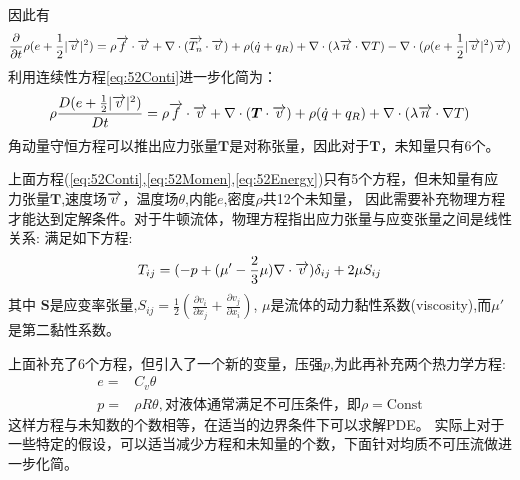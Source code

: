 因此有
\begin{equation}
\frac{\partial}{\partial t} \rho(e+\frac{1}{2}|\overrightarrow{v}|^2)  =
 \rho \overrightarrow{f}\cdot\overrightarrow{v}  + 
\nabla\cdot(\overrightarrow{T_n}\cdot\overrightarrow{v})  + 
\rho (\dot{q}+q_R) 
+\nabla\cdot(\lambda \overrightarrow{n}\cdot \nabla T) -
\nabla\cdot(\rho(e+\frac{1}{2}|\overrightarrow{v}|^2)\overrightarrow{v})
\end{equation}
利用连续性方程\eqref{eq:52Conti}进一步化简为：
\begin{equation}\label{eq:52Energy}
\rho \frac{D(e+\frac{1}{2}|\overrightarrow{v}|^2)}{Dt}=\rho \overrightarrow{f}\cdot\overrightarrow{v}+\nabla\cdot(\bm{T}\cdot\overrightarrow{v})+\rho(\dot{q}+q_R) +\nabla\cdot(\lambda \overrightarrow{n}\cdot \nabla T)
\end{equation}
角动量守恒方程可以推出应力张量$\bm{T}$是对称张量，因此对于$\bm{T}$，未知量只有6个。

上面方程(\ref{eq:52Conti},\ref{eq:52Momen},\ref{eq:52Energy})只有5个方程，但未知量有应力张量$\bm{T}$,速度场$\overrightarrow{v}$，温度场$\theta$,内能$e$,密度$\rho$共12个未知量，
因此需要补充物理方程才能达到定解条件。对于牛顿流体，物理方程指出应力张量与应变张量之间是线性关系:
满足如下方程:
\begin{equation}\label{eq:52TSG}
T_{ij}=(-p+(\mu'-\frac{2}{3}\mu)\nabla\cdot \overrightarrow{v})\delta_{ij}+2\mu S_{ij}
 \end{equation}
其中 $\bm{S}$是应变率张量,$S_{ij}=\frac{1}{2}(\frac{\partial v_i}{\partial x_j}+\frac{\partial v_j}{\partial x_i})$,
$\mu$是流体的动力黏性系数(viscosity),而$\mu'$是第二黏性系数。

上面补充了6个方程，但引入了一个新的变量，压强$p$,为此再补充两个热力学方程:
\begin{align}
e=&C_v\theta\\
p=&\rho R\theta,\text{对液体通常满足不可压条件，即$\rho=$Const}
 \end{align}
 这样方程与未知数的个数相等，在适当的边界条件下可以求解PDE。
 实际上对于一些特定的假设，可以适当减少方程和未知量的个数，下面针对均质不可压流做进一步化简。

